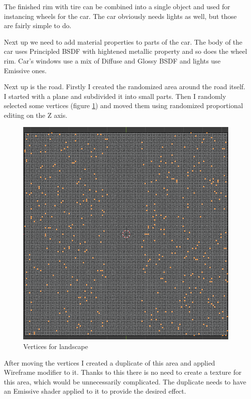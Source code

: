 \documentclass[12pt,a4paper,titlepage,final]{report}
\begin{document}
The finished rim with tire can be combined into a single object and used for instancing wheels for the car. The car obviously needs lights as well, but those are fairly simple to do.

Next up we need to add material properties to parts of the car. The body of the car uses Principled BSDF with hightened metallic property and so does the wheel rim. Car's windows use a mix of Diffuse and Glossy BSDF and lights use Emissive ones.

Next up is the road. Firstly I created the randomized area around the road itself. I started with a plane and subdivided it into small parts. Then I randomly selected some vertices (figure \ref{fig:rand_vert}) and moved them using randomized proportional editing on the Z axis.

\begin{figure}[H]
    \centering
    \includegraphics{images/rand_vert.png}
    \caption{Vertices for landscape}
    \label{fig:rand_vert}
\end{figure}

After moving the vertices I created a duplicate of this area and applied Wireframe modifier to it. Thanks to this there is no need to create a texture for this area, which would be unnecessarily complicated. The duplicate needs to have an Emissive shader applied to it to provide the desired effect.
\end{document}
